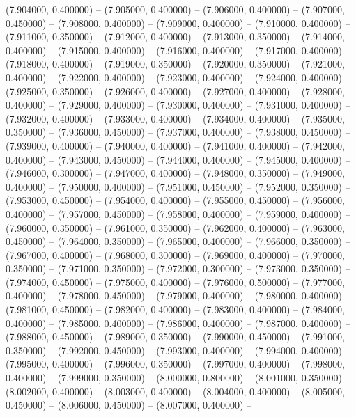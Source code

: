 (7.904000, 0.400000) -- 
(7.905000, 0.400000) -- 
(7.906000, 0.400000) -- 
(7.907000, 0.450000) -- 
(7.908000, 0.400000) -- 
(7.909000, 0.400000) -- 
(7.910000, 0.400000) -- 
(7.911000, 0.350000) -- 
(7.912000, 0.400000) -- 
(7.913000, 0.350000) -- 
(7.914000, 0.400000) -- 
(7.915000, 0.400000) -- 
(7.916000, 0.400000) -- 
(7.917000, 0.400000) -- 
(7.918000, 0.400000) -- 
(7.919000, 0.350000) -- 
(7.920000, 0.350000) -- 
(7.921000, 0.400000) -- 
(7.922000, 0.400000) -- 
(7.923000, 0.400000) -- 
(7.924000, 0.400000) -- 
(7.925000, 0.350000) -- 
(7.926000, 0.400000) -- 
(7.927000, 0.400000) -- 
(7.928000, 0.400000) -- 
(7.929000, 0.400000) -- 
(7.930000, 0.400000) -- 
(7.931000, 0.400000) -- 
(7.932000, 0.400000) -- 
(7.933000, 0.400000) -- 
(7.934000, 0.400000) -- 
(7.935000, 0.350000) -- 
(7.936000, 0.450000) -- 
(7.937000, 0.400000) -- 
(7.938000, 0.450000) -- 
(7.939000, 0.400000) -- 
(7.940000, 0.400000) -- 
(7.941000, 0.400000) -- 
(7.942000, 0.400000) -- 
(7.943000, 0.450000) -- 
(7.944000, 0.400000) -- 
(7.945000, 0.400000) -- 
(7.946000, 0.300000) -- 
(7.947000, 0.400000) -- 
(7.948000, 0.350000) -- 
(7.949000, 0.400000) -- 
(7.950000, 0.400000) -- 
(7.951000, 0.450000) -- 
(7.952000, 0.350000) -- 
(7.953000, 0.450000) -- 
(7.954000, 0.400000) -- 
(7.955000, 0.450000) -- 
(7.956000, 0.400000) -- 
(7.957000, 0.450000) -- 
(7.958000, 0.400000) -- 
(7.959000, 0.400000) -- 
(7.960000, 0.350000) -- 
(7.961000, 0.350000) -- 
(7.962000, 0.400000) -- 
(7.963000, 0.450000) -- 
(7.964000, 0.350000) -- 
(7.965000, 0.400000) -- 
(7.966000, 0.350000) -- 
(7.967000, 0.400000) -- 
(7.968000, 0.300000) -- 
(7.969000, 0.400000) -- 
(7.970000, 0.350000) -- 
(7.971000, 0.350000) -- 
(7.972000, 0.300000) -- 
(7.973000, 0.350000) -- 
(7.974000, 0.450000) -- 
(7.975000, 0.400000) -- 
(7.976000, 0.500000) -- 
(7.977000, 0.400000) -- 
(7.978000, 0.450000) -- 
(7.979000, 0.400000) -- 
(7.980000, 0.400000) -- 
(7.981000, 0.450000) -- 
(7.982000, 0.400000) -- 
(7.983000, 0.400000) -- 
(7.984000, 0.400000) -- 
(7.985000, 0.400000) -- 
(7.986000, 0.400000) -- 
(7.987000, 0.400000) -- 
(7.988000, 0.450000) -- 
(7.989000, 0.350000) -- 
(7.990000, 0.450000) -- 
(7.991000, 0.350000) -- 
(7.992000, 0.450000) -- 
(7.993000, 0.400000) -- 
(7.994000, 0.400000) -- 
(7.995000, 0.400000) -- 
(7.996000, 0.350000) -- 
(7.997000, 0.400000) -- 
(7.998000, 0.400000) -- 
(7.999000, 0.350000) -- 
(8.000000, 0.800000) -- 
(8.001000, 0.350000) -- 
(8.002000, 0.400000) -- 
(8.003000, 0.400000) -- 
(8.004000, 0.400000) -- 
(8.005000, 0.450000) -- 
(8.006000, 0.450000) -- 
(8.007000, 0.400000) -- 
